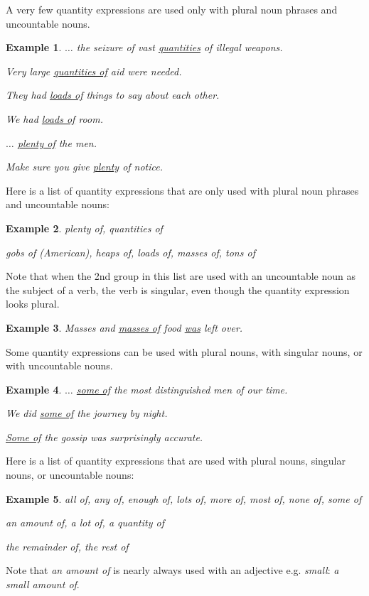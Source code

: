 \documentclass[oneside]{book}
\numberwithin{equation}{section}
\newtheorem{example}{Example}[section]
\begin{document}
%
\noindent{} A very few quantity expressions are used only with plural noun phrases and uncountable nouns.
\begin{example}
    $\ldots$ the seizure of vast \underline{quantities} of illegal weapons.
    
    Very large \underline{quantities of} aid were needed.
    
    They had \underline{loads of} things to say about each other.
    
    We had \underline{loads of} room.
    
    $\ldots$ \underline{plenty of} the men.
    
    Make sure you give \underline{plenty} of notice.
\end{example}
Here is a list of quantity expressions that are only used with plural noun phrases and uncountable nouns:
\begin{example}
    plenty of, quantities of
    
    gobs of (\emph{American}), heaps of, loads of, masses of, tons of
\end{example}
Note that when the 2nd group in this list are used with an uncountable noun as the subject of a verb, the verb is singular, even though the quantity expression looks plural.
\begin{example}
    Masses and \underline{masses of} food \underline{was} left over.
\end{example}
%
\noindent{} Some quantity expressions can be used with plural nouns, with singular nouns, or with uncountable nouns.
\begin{example}
    $\ldots$ \underline{some of} the most distinguished men of our time.
    
    We did \underline{some of} the journey by night.
    
    \underline{Some of} the gossip was surprisingly accurate.
\end{example}
Here is a list of quantity expressions that are used with plural nouns, singular nouns, or uncountable nouns:
\begin{example}
    all of, any of, enough of, lots of, more of, most of, none of, some of
    
    an amount of, a lot of, a quantity of
    
    the remainder of, the rest of
\end{example}
Note that \textit{an amount of} is nearly always used with an adjective e.g. \textit{small}: \textit{a small amount of}.
\end{document}
